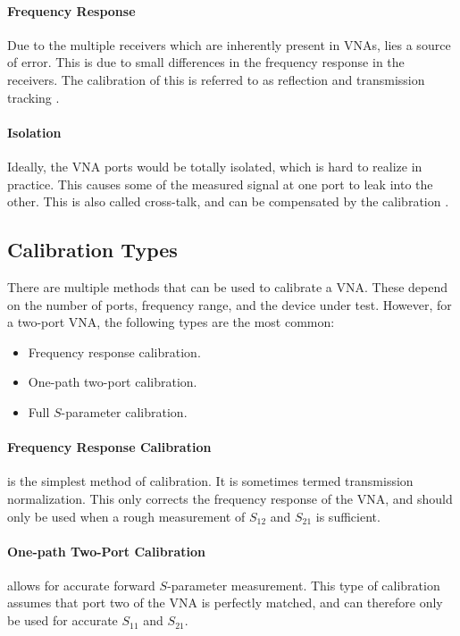 \paragraph{Frequency Response} Due to the multiple receivers which are inherently present in VNAs, lies a source of error. This is due to small differences in the frequency response in the receivers. The calibration of this is referred to as reflection and transmission tracking \cite{nationalInstruVNA}.
   
\paragraph{Isolation} Ideally, the VNA ports would be totally isolated, which is hard to realize in practice. This causes some of the measured signal at one port to leak into the other. This is also called cross-talk, and can be compensated by the calibration \cite{nationalInstruVNA}.

\subsection{Calibration Types}
There are multiple methods that can be used to calibrate a VNA. These depend on the number of ports, frequency range, and the device under test. However, for a two-port VNA, the following types are the most common:
\begin{itemize}
\item Frequency response calibration.
\item One-path two-port calibration.
\item Full $S$-parameter calibration.
\end{itemize}

\paragraph{Frequency Response Calibration} is the simplest method of calibration. It is sometimes termed transmission normalization. This only corrects the frequency response of the VNA, and should only be used when a rough measurement of $S_{12}$ and  $S_{21}$ is sufficient.
 
\paragraph{One-path Two-Port Calibration} allows for accurate forward $S$-parameter measurement. This type of calibration assumes that port two of the VNA is perfectly matched, and can therefore only be used for accurate $S_{11}$ and $S_{21}$.

